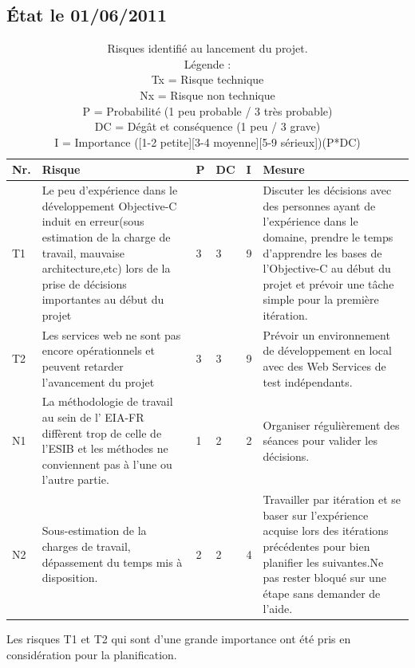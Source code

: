 	\subsection{État le 01/06/2011  }
	\begin{table}[H]
	\begin{tabular}{|l|p{6cm}|l|l|l|p{6cm}|}
		\hline  Nr. & Risque & P  & DC & I & Mesure \\ 
		\hline  T1 & Le peu d'expérience dans le développement \gls{Objective-C} induit en erreur(sous estimation de la charge de travail, mauvaise architecture,etc) lors de la prise de décisions importantes au début du projet & 3 & 3 & 9 & Discuter les décisions avec des personnes ayant de l'expérience dans le domaine, prendre le temps d'apprendre les bases de l'\gls{Objective-C} au début du projet et prévoir une tâche simple pour la première itération.  \\ 
		\hline  T2 & Les services web ne sont pas encore opérationnels et peuvent retarder l'avancement du projet & 3 & 3 & 9 & Prévoir un environnement de développement en local avec des Web Services de test indépendants.  \\ 
		\hline  N1 & La méthodologie de travail au sein de l' \gls{EIA-FR} diffèrent trop de celle de l'\gls{ESIB}  et les méthodes ne conviennent pas à l'une ou l'autre partie.  & 1 & 2 & 2 & Organiser régulièrement des séances pour valider les décisions.  \\ 
		\hline  N2 & Sous-estimation de la charges de travail, dépassement du temps mis à disposition.  & 2 & 2 & 4 & Travailler par itération et se baser sur l'expérience acquise lors des itérations précédentes pour bien planifier les suivantes.Ne pas rester bloqué sur une étape sans demander de l'aide.  \\ 
		
		\hline 
	\end{tabular} 
	\caption{ Risques identifié au lancement du projet.\\ Légende :\\
Tx = Risque technique\\
Nx = Risque non technique\\
P = Probabilité  (1 peu probable / 3 très probable)\\ 
DC = Dégât et conséquence (1 peu / 3 grave)\\
I =  Importance ([1-2 petite][3-4 moyenne][5-9 sérieux])(P*DC)
}
	\end{table}
Les risques T1 et T2 qui sont d'une grande importance ont été pris en considération pour la planification.
